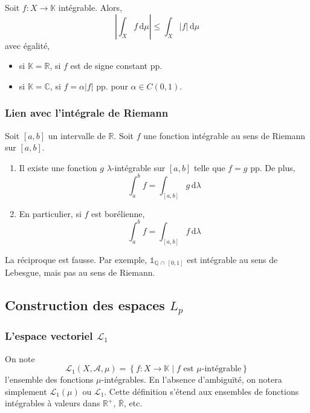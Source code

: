   \begin{proposition}
    Soit $f : X \rightarrow \mathbb{K}$ intégrable. Alors,
    \[ \left\vert \int_X f \, \mathrm{d}\mu \right\vert \leq \int_X \vert f \vert \, \mathrm{d}\mu \]
    avec égalité,
    \begin{itemize}
      \item si $\mathbb{K} = \mathbb{R}$, si $f$ est de signe constant pp.
      \item si $\mathbb{K} = \mathbb{C}$, si $f = \alpha \vert f \vert$ pp. pour $\alpha \in C(0,1)$.
    \end{itemize}
  \end{proposition}

  \subsubsection{Lien avec l'intégrale de Riemann}

  \begin{proposition}
    Soit $[a,b]$ un intervalle de $\mathbb{R}$. Soit $f$ une fonction intégrable au sens de Riemann sur $[a,b]$.
    \begin{enumerate}[label=(\roman*)]
      \item Il existe une fonction $g$ $\lambda$-intégrable sur $[a,b]$ telle que $f = g$ pp. De plus,
      \[ \int_a^b f = \int_{[a,b]} g \, \mathrm{d}\lambda \]
      \item En particulier, si $f$ est borélienne,
      \[ \int_a^b f = \int_{[a,b]} f \, \mathrm{d}\lambda \]
    \end{enumerate}
  \end{proposition}

  \begin{cexample}
    La réciproque est fausse. Par exemple, $\mathbb{1}_{\mathbb{Q} \, \cap \, [0,1]}$ est intégrable au sens de Lebesgue, mais pas au sens de Riemann.
  \end{cexample}

  \subsection{Construction des espaces \texorpdfstring{$L_p$}{Lₚ}}

  \subsubsection{L'espace vectoriel \texorpdfstring{$\mathcal{L}_1$}{L₁}}

  \begin{definition}
    \label{234-1}
    On note
    \[ \mathcal{L}_1(X, \mathcal{A}, \mu) = \left\{ f : X \rightarrow \mathbb{K} \mid f \text{ est } \mu\text{-intégrable} \right\} \]
    l'ensemble des fonctions $\mu$-intégrables. En l'absence d'ambiguïté, on notera simplement $\mathcal{L}_1(\mu)$ ou $\mathcal{L}_1$. Cette définition s'étend aux ensembles de fonctions intégrables à valeurs dans $\mathbb{R}^+$, $\overline{\mathbb{R}}$, etc.
  \end{definition}

